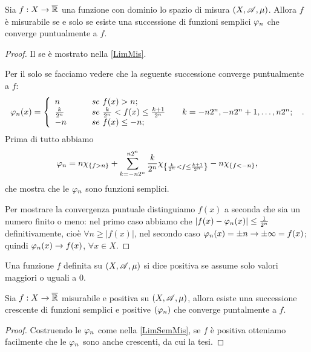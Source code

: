 \begin{proposition}
	\label{LimSemMis}
	Sia $f:X \rightarrow \overline{\mathbb R}$ una funzione con dominio lo spazio di misura $(X,\mathscr A,\mu)$.
	Allora $f$ è misurabile se e solo se esiste una successione di funzioni semplici $\varphi_n$ che converge puntualmente a $f$.
\end{proposition}
\begin{proof}
	Il se è mostrato nella \cref{LimMis}.
	
	Per il solo se facciamo vedere che la seguente successione converge puntualmente a $f$:
	\[
		\varphi_n(x) =
		\left\{ \begin{array}{ll}
			n &\qquad se\ f(x)>n;\\
			\frac{k}{2^n} &\qquad se\ \frac{k}{2^n}<f(x)\leq \frac{k+1}{2^n} \qquad k=-n2^n,-n2^n+1,\dots,n2^n;\\
			-n &\qquad se\ f(x)\leq-n;
		\end{array} \right.\ .
	\]
	Prima di tutto abbiamo 
	\[\varphi_n=
		n\chi_{\{f>n\}}+
		\sum_{k=-n2^n}^{n2^n}\frac{k}{2^n}\chi_{\left\{ \frac{k}{2^n}<f\leq \frac{k+1}{2^n} \right\}}
		-n\chi_{\{f<-n\}},
	\]
	che mostra che le $\varphi_n$ sono funzioni semplici.
	
	Per mostrare la convergenza puntuale distinguiamo $f(x)$ a seconda che sia un numero finito o meno:
	nel primo caso abbiamo che $|f(x)-\varphi_n(x)|\leq \frac{1}{2^n}$ definitivamente, cioè $\forall n\geq |f(x)|$,
	nel secondo caso $\varphi_n(x)=\pm n\rightarrow \pm\infty = f(x)$;
	quindi $\varphi_n(x)\rightarrow f(x)$, $\forall x\in X$.
\end{proof}

\begin{definition}
	Una funzione $f$ definita su $(X,\mathscr A,\mu)$ si dice positiva se assume solo valori maggiori o uguali a 0.
\end{definition}


\begin{corollary}\label{LimSemCrescMis}
	Sia $f:X\rightarrow \overline{\mathbb R}$ misurabile e positiva su $(X,\mathscr A,\mu)$, allora esiste una successione crescente di funzioni semplici e positive $(\varphi_n)$ che converge puntalmente a $f$.
\end{corollary}
\begin{proof}
	Costruendo le $\varphi_n$ come nella \cref{LimSemMis}, se $f$ è positiva otteniamo facilmente che le $\varphi_n$ sono anche crescenti, da cui la tesi.
\end{proof}


